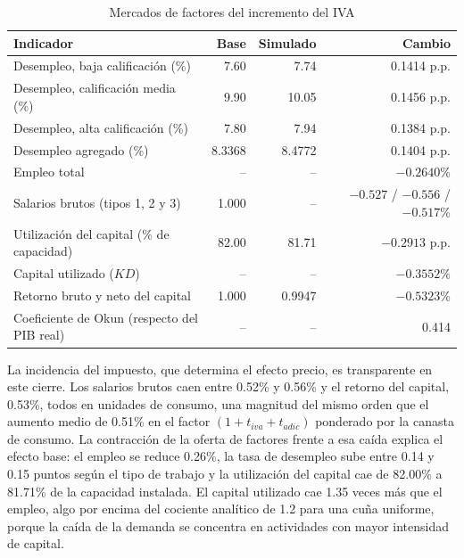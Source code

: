 \documentclass[11pt]{article}
\begin{document}
\begin{table}[H]
\centering
\caption{Mercados de factores del incremento del IVA}
\small
\begin{tabular}{|l|r|r|r|}
  \hline
  Indicador & Base & Simulado & Cambio \\
  \hline
  Desempleo, baja calificación (\%) & 7.60 & 7.74 & 0.1414 p.p. \\
  \hline
  Desempleo, calificación media (\%) & 9.90 & 10.05 & 0.1456 p.p. \\
  \hline
  Desempleo, alta calificación (\%) & 7.80 & 7.94 & 0.1384 p.p. \\
  \hline
  Desempleo agregado (\%) & 8.3368 & 8.4772 & 0.1404 p.p. \\
  \hline
  Empleo total & -- & -- & $-0.2640$\% \\
  \hline
  Salarios brutos (tipos 1, 2 y 3) & 1.000 & -- & $-0.527$ / $-0.556$ / $-0.517$\% \\
  \hline
  Utilización del capital (\% de capacidad) & 82.00 & 81.71 & $-0.2913$ p.p. \\
  \hline
  Capital utilizado ($KD$) & -- & -- & $-0.3552$\% \\
  \hline
  Retorno bruto y neto del capital & 1.000 & 0.9947 & $-0.5323$\% \\
  \hline
  Coeficiente de Okun (respecto del PIB real) & -- & -- & 0.414 \\
  \hline
\end{tabular}
\end{table}

La incidencia del impuesto, que determina el efecto precio, es transparente en este cierre. Los salarios brutos caen entre 0.52\% y 0.56\% y el retorno del capital, 0.53\%, todos en unidades de consumo, una magnitud del mismo orden que el aumento medio de 0.51\% en el factor $(1+t_{iva}+t_{adic})$ ponderado por la canasta de consumo. La contracción de la oferta de factores frente a esa caída explica el efecto base: el empleo se reduce 0.26\%, la tasa de desempleo sube entre 0.14 y 0.15 puntos según el tipo de trabajo y la utilización del capital cae de 82.00\% a 81.71\% de la capacidad instalada. El capital utilizado cae 1.35 veces más que el empleo, algo por encima del cociente analítico de 1.2 para una cuña uniforme, porque la caída de la demanda se concentra en actividades con mayor intensidad de capital.
\end{document}
